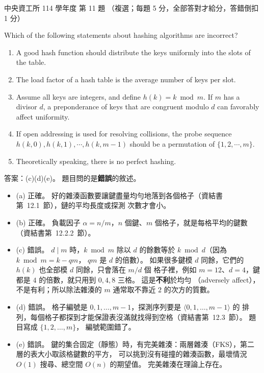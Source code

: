 \begin{pastexam}[label={px:ncu-114-dsa-11}]{中央資工所 114 學年度 第 11 題}
（複選；每題 5 分，全部答對才給分，答錯倒扣 1 分）

Which of the following statements about hashing algorithms are incorrect?
\begin{enumerate}[label=(\alph*)]
\item A good hash function should distribute the keys uniformly into the slots of the table.
\item The load factor of a hash table is the average number of keys per slot.
\item Assume all keys are integers, and define $h(k)=k \bmod m$. If $m$ has a divisor $d$, a
preponderance of keys that are congruent modulo $d$ can favorably affect uniformity.
\item If open addressing is used for resolving collisions, the probe sequence
$h(k,0),h(k,1),\cdots,h(k,m-1)$ should be a permutation of $\{1,2,\cdots,m\}$.
\item Theoretically speaking, there is no perfect hashing.
\end{enumerate}
\end{pastexam}

\begin{pastsoln}
答案：(c)(d)(e)。 題目問的是\textbf{錯誤}的敘述。

\begin{itemize}
\item (a) 正確。 好的雜湊函數要讓鍵盡量均勻地落到各個格子（資結書第~12.1~節），鏈的平均長度或探測
次數才會小。
\item (b) 正確。 負載因子 $\alpha = n/m$，$n$ 個鍵、$m$ 個格子，就是每格平均的鍵數（資結書第~12.2.2~節）。
\item (c) 錯誤。 $d \mid m$ 時，$k \bmod m$ 除以 $d$ 的餘數等於 $k \bmod d$（因為 $k \bmod m = k - qm$，
$qm$ 是 $d$ 的倍數）。 如果很多鍵模 $d$ 同餘，它們的 $h(k)$ 也全部模 $d$ 同餘，只會落在 $m/d$ 個
格子裡，例如 $m = 12$、$d = 4$，鍵都是 $4$ 的倍數，就只用到 $0, 4, 8$ 三格。 這是\textbf{不利}於均勻
（adversely affect），不是有利；所以除法雜湊的 $m$ 通常取不靠近 $2$ 的次方的質數。
\item (d) 錯誤。 格子編號是 $0, 1, \ldots, m - 1$，探測序列要是 $\langle 0, 1, \ldots, m-1\rangle$ 的
排列，每個格子都探到才能保證表沒滿就找得到空格（資結書第~12.3~節）。 題目寫成 $\{1, 2, \ldots, m\}$，
編號範圍錯了。
\item (e) 錯誤。 鍵的集合固定（靜態）時，有完美雜湊：兩層雜湊（FKS），第二層的表大小取該格鍵數的平方，
可以挑到沒有碰撞的雜湊函數，最壞情況 $O(1)$ 搜尋、總空間 $O(n)$ 的期望值。 完美雜湊在理論上存在。
\end{itemize}
\end{pastsoln}
